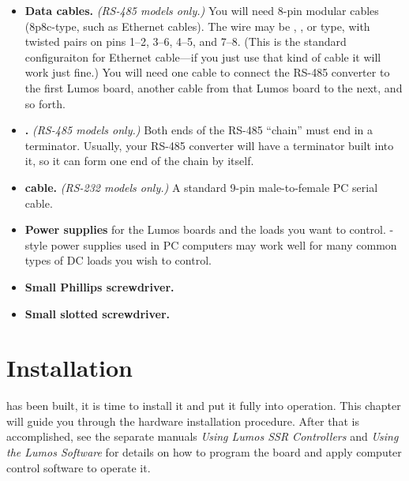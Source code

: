 \documentclass[letterpaper,twoside,onecolumn,openright,final]{memoir}
\begin{document}
\begin{itemize}
	\item	{\bfseries Data cables.}  \emph{(RS-485 models only.)}
		You will need 8-pin modular cables (8p8c-type, such as Ethernet cables).  The 
		wire may be , , or  type, 
		with twisted pairs on pins 1--2, 3--6, 4--5, and 7--8.
		(This is the standard configuraiton for Ethernet cable---if you just use that kind of cable
		it will work just fine.)  You will need one cable to connect the RS-485 converter to the
		first Lumos board, another cable from that Lumos board to the next, and so forth.  

	\item	{\bfseries {} .}  \emph{(RS-485 models only.)}
		Both ends of the RS-485 ``chain'' must end in a terminator.
		Usually, your RS-485 converter will have a terminator built into it, so it can form one end of the chain
		by itself.

	\item	{\bfseries {} cable.} \emph{(RS-232 models only.)}
		A standard 9-pin male-to-female PC serial cable.

	\item	{\bfseries Power supplies} for the Lumos boards and the loads you want to control.  -style power
		supplies used in PC computers may work well for many common types of DC loads you wish to control.

	\item	{\bfseries Small Phillips screwdriver.}

	\item	{\bfseries Small slotted screwdriver.}
\end{itemize}

\chapter{Installation}\label{ch:installation}
 has been built, it is time to install it and
put it fully into operation.  This chapter will guide you through the hardware installation
procedure.
After that is accomplished, see the separate manuals \emph{Using Lumos SSR Controllers} 
and \emph{Using the Lumos Software} for 
details on how to program the board and apply computer control software to operate it.
\end{document}
